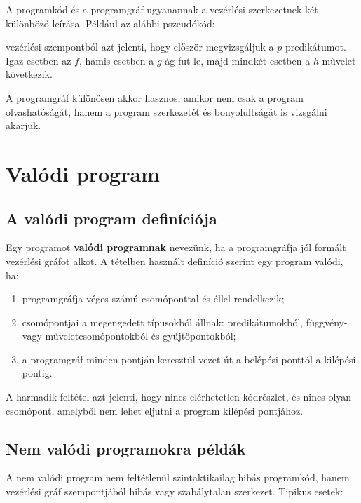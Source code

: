 A programkód és a programgráf ugyanannak a vezérlési szerkezetnek két különböző leírása. Például az alábbi pszeudókód:


vezérlési szempontból azt jelenti, hogy először megvizsgáljuk a $p$ predikátumot. Igaz esetben az $f$, hamis esetben a $g$ ág fut le, majd mindkét esetben a $h$ művelet következik.

A programgráf különösen akkor hasznos, amikor nem csak a program olvashatóságát, hanem a program szerkezetét és bonyolultságát is vizsgálni akarjuk.

\section{Valódi program}

\subsection{A valódi program definíciója}

Egy programot \textbf{valódi programnak} nevezünk, ha a programgráfja jól formált vezérlési gráfot alkot. A tételben használt definíció szerint egy program valódi, ha:

\begin{enumerate}
  \item programgráfja véges számú csomóponttal és éllel rendelkezik;
  \item csomópontjai a megengedett típusokból állnak: predikátumokból, függvény- vagy műveletcsomópontokból és gyűjtőpontokból;
  \item a programgráf minden pontján keresztül vezet út a belépési ponttól a kilépési pontig.
\end{enumerate}

A harmadik feltétel azt jelenti, hogy nincs elérhetetlen kódrészlet, és nincs olyan csomópont, amelyből nem lehet eljutni a program kilépési pontjához.

\subsection{Nem valódi programokra példák}

A nem valódi program nem feltétlenül szintaktikailag hibás programkód, hanem vezérlési gráf szempontjából hibás vagy szabálytalan szerkezet. Tipikus esetek:

